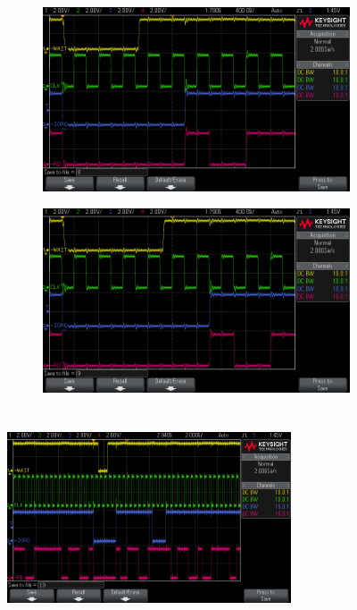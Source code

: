 \documentclass[fleqn]{article}
\begin{document}
\begin{figure}[H]
\begin{subfigure}[b]{0.49\textwidth}
		\caption{}
	\end{subfigure}
	\begin{subfigure}[b]{0.49\textwidth}
		\includegraphics[width=\textwidth]{img/2d.png}
		\caption{}
	\end{subfigure}
	\begin{subfigure}[b]{0.49\textwidth}
		\includegraphics[width=\textwidth]{img/2e.png}
		\caption{}
	\end{subfigure}
	\caption{}
\end{figure}

\section{} %

\begin{figure}[H]
	\centering
	\includegraphics[width=0.75\textwidth]{img/3a.png}
	\caption{}
\end{figure}
\end{document}
